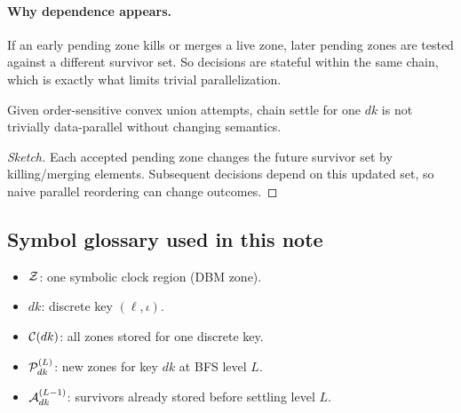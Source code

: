 \paragraph{Why dependence appears.}
If an early pending zone kills or merges a live zone, later pending zones are tested against a different survivor set.
So decisions are stateful within the same chain, which is exactly what limits trivial parallelization.

\begin{proposition}
Given order-sensitive convex union attempts, chain settle for one $dk$ is not trivially data-parallel without changing semantics.
\end{proposition}

\begin{proof}[Sketch]
Each accepted pending zone changes the future survivor set by killing/merging elements.
Subsequent decisions depend on this updated set, so naive parallel reordering can change outcomes.
\end{proof}

\subsection{Symbol glossary used in this note}
\begin{itemize}
  \item $\mathcal{Z}$: one symbolic clock region (DBM zone).
  \item $dk$: discrete key $(\ell,\iota)$.
  \item $\mathcal{C}(dk)$: all zones stored for one discrete key.
  \item $\mathcal{P}_{dk}^{(L)}$: new zones for key $dk$ at BFS level $L$.
  \item $\mathcal{A}_{dk}^{(L-1)}$: survivors already stored before settling level $L$.
\end{itemize}


